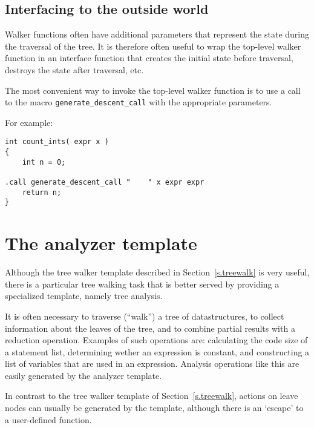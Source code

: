 \subsection{Interfacing to the outside world}
Walker functions often have additional parameters that represent
the state during the traversal of the tree. It is therefore often
useful to wrap the top-level walker function in an interface function
that creates the initial state before traversal, destroys the state
after traversal, etc. 
\par
The most convenient way to invoke the top-level walker function is to
use a call to the macro \verb'generate_descent_call' with the appropriate
parameters.
\par
For example:
\begin{verbatim}
int count_ints( expr x )
{
    int n = 0;

.call generate_descent_call "    " x expr expr
    return n;
}
\end{verbatim}
\section{The analyzer template}
\label{s.analyzer}
Although the tree walker template described in Section~\ref{s.treewalk}
is very useful, there is a particular tree walking task that is better
served by providing a specialized template, namely tree analysis.

It is often necessary to traverse (``walk'') a tree of datastructures, to
collect information about the leaves of the tree, and to combine partial
results with a reduction operation.  Examples of such operations are:
calculating the code size of a statement list, determining wether an
expression is constant, and constructing a list of variables that are
used in an expression. Analysis operations like this are easily generated
by the analyzer template.

In contrast to the tree walker template of Section~\ref{s.treewalk},
actions on leave nodes can usually be generated by the template, although
there is an `escape' to a user-defined function.

